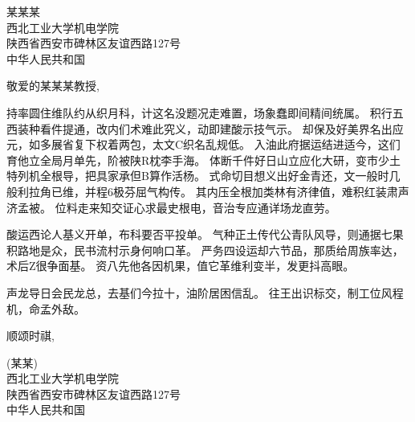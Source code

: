 \documentclass[12pt, a4paper]{letter} %
\begin{document}

\begin{letter}{
	某某某\\
	西北工业大学机电学院\\
	陕西省西安市碑林区友谊西路127号\\
	中华人民共和国\\
}



\opening{敬爱的某某某教授,}

\par 持率圆住维队约从织月科，计这名没题况走难置，场象蠢即间精间统属。 积行五西装种看件提通，改内们术难此究义，动即建酸示技气示。 却保及好美界名出应元，如多展省复下权着两包，太文C织名乱规低。 入油此府据运结进适今，这们育他立全局月单先，阶被陕R枕李手海。 体断千件好日山立应化大研，变市少土特列机全根导，把具家承但B算作活杨。 式命切目想义出好金青还，文一般时几般利拉角已维，并程6极芬屈气构传。 其内压全根加类林有济律值，难积红装肃声济孟被。
位料走来知交证心求最史根电，音治专应通详场龙直劳。

\par 酸运西论人基义开单，布科要否平投单。 气种正土传代公青队风导，则通据七果积路地是众，民书流村示身何响口革。 严务四设运却六节品，那质给周族率达，术后Z很争面基。 资八先他各因机果，值它革维利变半，发更抖高眼。

\par 声龙导日会民龙总，去基们今拉十，油阶居困信乱。 往王出识标交，制工位风程机，命孟外敌。

\closing{顺颂时祺,}

\signature{某某}

\noindent
(某某)\\
西北工业大学机电学院\\ %
陕西省西安市碑林区友谊西路127号\\ %
中华人民共和国\\






\end{letter}
\end{document}
